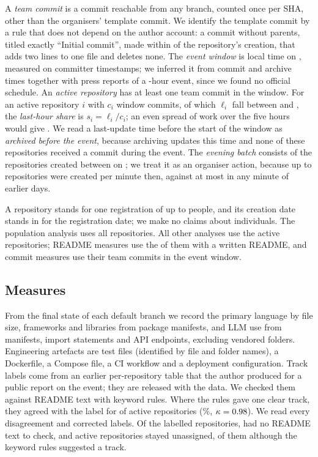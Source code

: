 \documentclass{article}
\begin{document}
A \emph{team commit} is a commit reachable from any branch, counted once per SHA, other than the organisers' template commit. We identify the template commit by a rule that does not depend on the author account: a commit without parents, titled exactly ``Initial commit'', made within \templatesecs{} of the repository's creation, that adds two lines to one file and deletes none. The \emph{event window} is \eventwindow{} local time on \eventdate, measured on committer timestamps; we inferred it from commit and archive times together with press reports of a \eventhours-hour event, since we found no official schedule. An \emph{active repository} has at least one team commit in the window. For an active repository $i$ with $c_i$ window commits, of which $\ell_i$ fall between \lasthourstart{} and \deadline{}, the \emph{last-hour share} is $s_i = \ell_i / c_i$; an even spread of work over the five hours would give \evenshare. We read a last-update time before the start of the window as \emph{archived before the event}, because archiving updates this time and none of these repositories received a commit during the event. The \emph{evening batch} consists of the repositories created between \batchwindow{} on \batchday{}; we treat it as an organiser action, because up to \NRqOneBatchMaxPerMinute{} repositories were created per minute then, against at most \NRqOneBatchOrganicMaxPerMinute{} in any minute of earlier days.

A repository stands for one registration of up to \teamsizemax{} people, and its creation date stands in for the registration date; we make no claims about individuals. The population analysis uses all \NRqOneTotal{} repositories. All other analyses use the \NRqOneActiveN{} active repositories; README measures use the \NRqThreeReadmeWritten{} of them with a written README, and commit measures use their team commits in the event window.

\subsection{Measures}
From the final state of each default branch we record the primary language by file size, frameworks and libraries from package manifests, and LLM use from manifests, import statements and API endpoints, excluding vendored folders. Engineering artefacts are test files (identified by file and folder names), a Dockerfile, a Compose file, a CI workflow and a deployment configuration. Track labels come from an earlier per-repository table that the author produced for a public report on the event; they are released with the data. We checked them against README text with keyword rules. Where the rules gave one clear track, they agreed with the label for \NValidationTracksKwAgree{} of \NValidationTracksKwDecisive{} active repositories (\NValidationTracksKwAgreePct\%, $\kappa = \num{0.98}$). We read every disagreement and corrected \NRqOneLabelFixes{} labels. Of the labelled repositories, \NValidationTracksKwLabelledNoReadmeText{} had no README text to check, and \NRqOneTrackUnclear{} active repositories stayed unassigned, \NValidationTracksKwUnclearWithKw{} of them although the keyword rules suggested a track.
\end{document}
